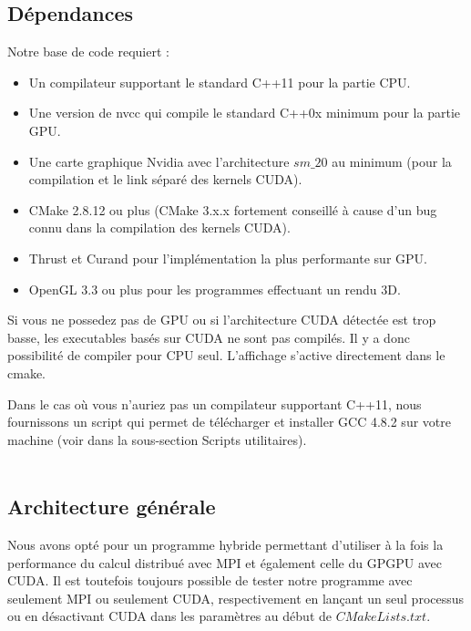 \subsection{Dépendances}
Notre base de code requiert :
\begin{itemize}
    \item Un compilateur supportant le standard C++11 pour la partie CPU.
    \item Une version de nvcc qui compile le standard C++0x minimum pour la partie GPU.
    \item Une carte graphique Nvidia avec l'architecture $sm\_20$ au minimum (pour la compilation et le link séparé des kernels CUDA).
    \item CMake 2.8.12 ou plus (CMake 3.x.x fortement conseillé à cause d'un bug connu dans la compilation des kernels CUDA).
    \item Thrust et Curand pour l'implémentation la plus performante sur GPU.
    \item OpenGL 3.3 ou plus pour les programmes effectuant un rendu 3D.
\end{itemize}


Si vous ne possedez pas de GPU ou si l'architecture CUDA détectée est trop basse, les executables basés sur CUDA ne sont pas compilés.
Il y a donc possibilité de compiler pour CPU seul. L'affichage s'active directement dans le cmake.

Dans le cas où vous n'auriez pas un compilateur supportant C++11, nous fournissons un script qui permet de télécharger et installer GCC 4.8.2 sur votre machine (voir dans la sous-section Scripts utilitaires).\\\\

\subsection{Architecture générale}
Nous avons opté pour un programme hybride permettant d'utiliser à la fois la performance du calcul distribué avec MPI et également celle du GPGPU avec CUDA. Il est toutefois toujours possible de tester notre programme avec seulement MPI ou seulement CUDA, respectivement en lançant un seul processus ou en désactivant CUDA dans les paramètres au début de $CMakeLists.txt$.\\\\

